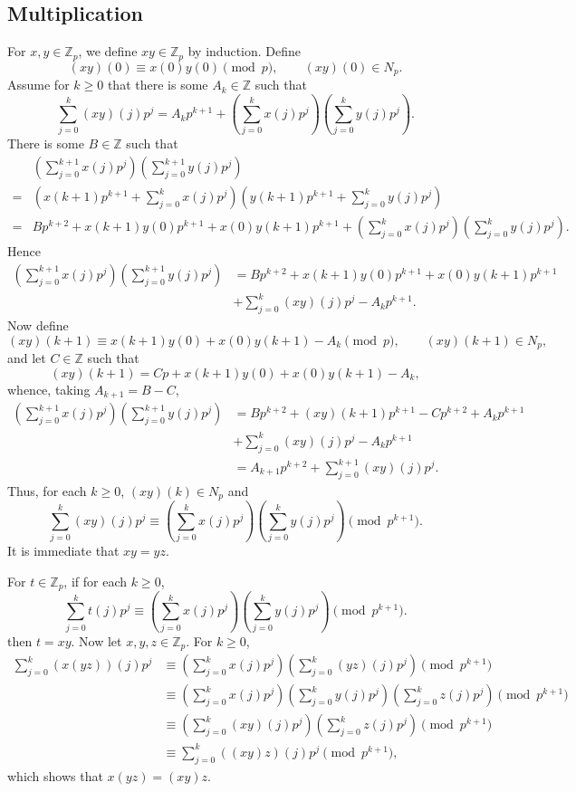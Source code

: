 \documentclass{article}
\theoremstyle{definition}
\begin{document}
\subsection{Multiplication}
For $x,y \in \mathbb{Z}_p$, we define $xy \in \mathbb{Z}_p$ by induction.
Define
\[
(xy)(0) \equiv x(0) y(0) \pmod{p},\qquad (xy)(0) \in N_p.
\]
Assume for $k \geq 0$ that there is some $A_k \in \mathbb{Z}$ such that 
\[
\sum_{j=0}^k (xy)(j) p^j = A_k p^{k+1} +\left( \sum_{j=0}^k x(j) p^j \right) \left( \sum_{j=0}^k y(j) p^j\right).
\]
There is some $B \in \mathbb{Z}$ such that 
\[
\begin{split}
&\left( \sum_{j=0}^{k+1} x(j) p^j \right) \left( \sum_{j=0}^{k+1} y(j) p^j\right)\\
=&\left( x(k+1) p^{k+1} + \sum_{j=0}^k x(j) p^j \right) \left( y(k+1) p^{k+1} + \sum_{j=0}^k y(j) p^j\right)\\
=&B p^{k+2} + x(k+1)y(0) p^{k+1} + x(0)y(k+1)p^{k+1} + \left( \sum_{j=0}^k x(j) p^j \right) \left( \sum_{j=0}^k y(j) p^j\right).
\end{split}
\]
Hence
\begin{align*}
\left( \sum_{j=0}^{k+1} x(j) p^j \right) \left( \sum_{j=0}^{k+1} y(j) p^j\right)&=B p^{k+2} + x(k+1)y(0) p^{k+1} + x(0)y(k+1)p^{k+1}\\
&+\sum_{j=0}^k (xy)(j) p^j - A_k p^{k+1}.
\end{align*}
Now define
\[
(xy)(k+1) \equiv x(k+1)y(0) + x(0)y(k+1) - A_k \pmod{p},\qquad (xy)(k+1) \in N_p,
\]
and let $C \in \mathbb{Z}$ such that
\[
(xy)(k+1) = Cp + x(k+1)y(0) + x(0)y(k+1) - A_k,
\]
whence, taking $A_{k+1} = B-C$,
\begin{align*}
\left( \sum_{j=0}^{k+1} x(j) p^j \right) \left( \sum_{j=0}^{k+1} y(j) p^j\right)&=Bp^{k+2} + 
(xy)(k+1)p^{k+1} - Cp^{k+2} + A_kp^{k+1}\\
&+\sum_{j=0}^k (xy)(j) p^j - A_k p^{k+1}\\
&=A_{k+1}p^{k+2} + \sum_{j=0}^{k+1} (xy)(j) p^j.
\end{align*}
Thus, for each $k \geq 0$, $(xy)(k) \in N_p$ and 
\begin{equation}
\sum_{j=0}^k (xy)(j) p^j \equiv \left( \sum_{j=0}^k x(j) p^j \right) \left( \sum_{j=0}^k y(j) p^j\right) \pmod{p^{k+1}}.
\label{multiplication}
\end{equation}
It is immediate that $xy=yz$. 

For $t \in \mathbb{Z}_p$, if for each $k \geq 0$,
\[
\sum_{j=0}^k t(j) p^j \equiv \left( \sum_{j=0}^k x(j) p^j \right) \left( \sum_{j=0}^k y(j) p^j\right) \pmod{p^{k+1}}.
\]
then $t=xy$. Now let $x,y,z \in \mathbb{Z}_p$. For $k \geq 0$,
\begin{align*}
\sum_{j=0}^k (x(yz))(j) p^j &\equiv\left( \sum_{j=0}^k x(j) p^j \right) \left( \sum_{j=0}^k (yz)(j) p^j\right) \pmod{p^{k+1}}\\
&\equiv \left( \sum_{j=0}^k x(j) p^j \right)  \left( \sum_{j=0}^k y(j) p^j \right) \left( \sum_{j=0}^k z(j) p^j\right) \pmod{p^{k+1}}\\
&\equiv \left( \sum_{j=0}^k (xy)(j) p^j\right) \left( \sum_{j=0}^k z(j) p^j \right) \pmod{p^{k+1}}\\
&\equiv  \sum_{j=0}^k ((xy)z)(j) p^j \pmod{p^{k+1}},
\end{align*}
which shows that $x(yz)=(xy)z$. 
\end{document}
